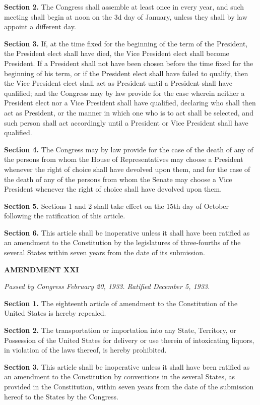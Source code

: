 \textbf{Section 2.}
The Congress shall assemble at least once in every year, and such meeting shall begin at noon on the 3d day of January, unless they shall by law appoint a different day.

\textbf{Section 3.}
If, at the time fixed for the beginning of the term of the President, the President elect shall have died, the Vice President elect shall become President. If a President shall not have been chosen before the time fixed for the beginning of his term, or if the President elect shall have failed to qualify, then the Vice President elect shall act as President until a President shall have qualified; and the Congress may by law provide for the case wherein neither a President elect nor a Vice President shall have qualified, declaring who shall then act as President, or the manner in which one who is to act shall be selected, and such person shall act accordingly until a President or Vice President shall have qualified.

\textbf{Section 4.}
The Congress may by law provide for the case of the death of any of the persons from whom the House of Representatives may choose a President whenever the right of choice shall have devolved upon them, and for the case of the death of any of the persons from whom the Senate may choose a Vice President whenever the right of choice shall have devolved upon them.

\textbf{Section 5.}
Sections 1 and 2 shall take effect on the 15th day of October following the ratification of this article.

\textbf{Section 6.}
This article shall be inoperative unless it shall have been ratified as an amendment to the Constitution by the legislatures of three-fourths of the several States within seven years from the date of its submission.

\begin{center} 
\textbf{AMENDMENT XXI}
\end{center} 

\textit{Passed by Congress February 20, 1933. Ratified December 5, 1933.}

\textbf{Section 1.}
The eighteenth article of amendment to the Constitution of the United States is hereby repealed.

\textbf{Section 2.}
The transportation or importation into any State, Territory, or Possession of the United States for delivery or use therein of intoxicating liquors, in violation of the laws thereof, is hereby prohibited.

\textbf{Section 3.}
This article shall be inoperative unless it shall have been ratified as an amendment to the Constitution by conventions in the several States, as provided in the Constitution, within seven years from the date of the submission hereof to the States by the Congress.


